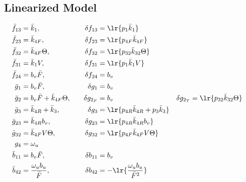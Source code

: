 \subsection{Linearized Model}
\begin{align*}
     \bar f_{13} &= \bar k_{1}, \quad&
    \delta f_{13} &= \lr{ p_{1} \bar k_{1} } \\
     \bar f_{23} &= \bar k_{4F}, \quad &
    \delta f_{23}  &= \lr{ p_{4F} \bar k_{4F} } \\
     \bar f_{32} &= \bar k_{4F} \Theta, \quad &
    \delta f_{32}  &= \lr{ p_{32}  \bar k_{32} \Theta }
    \\
     \bar f_{31} &= \bar k_1 V, \quad &
    \delta f_{31}  &= \lr{ p_1 \bar k_1 V }
    \\
     \bar f_{24} &= b_v \bar F,
    \quad &
    \delta f_{24}  &= b_v
    \\
     \bar g_1 &= b_v \bar F,
    \quad &
    \delta g_1  &= b_v
    \\
    \bar g_2 &= b_v \bar F + \bar k_{4F} \Theta,
    \quad &
    \delta g_{2_F}  &= b_v
    \quad &
    \delta g_{2_T} &= \lr{ p_{32}  \bar k_{32}  \Theta }
    \\
    \bar g_3 &= \bar k_{4R} + \bar k_3,
    \quad &
    \delta g_3 &= \lr{ p_{4R} \bar k_{4R} + p_3 \bar k_3}
    \\
    \bar g_{23} &= \bar k_{4R} b_v,
    \quad &
    \delta g_{23}  &= \lr{ p_{4R} \bar k_{4R} b_v }
    \\
    \bar g_{32} &= \bar k_{4F} V \Theta,
    \quad &
    \delta g_{32}  &= \lr{ p_{4F} \bar k_{4F} V \Theta }
    \\
    g_4 &= \omega_u
    \\
    \bar b_{11} &= b_v \bar F,
    \quad &
    \delta b_{11} &= b_v
    \\
    \bar b_{42} &= \frac{\omega_u b_u}{\bar F},
    \quad &
    \delta b_{42}  &= -\lr{\frac{\omega_u b_u}{\bar F^2}}
\end{align*}


